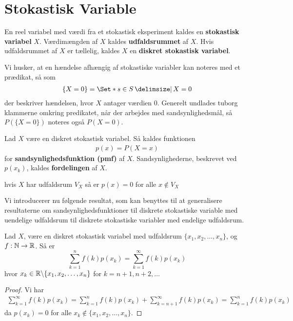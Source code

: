 \section{Stokastisk Variable} \label{sec:SV}
\begin{defn}%
En reel variabel med værdi fra et stokastisk eksperiment kaldes en \textbf{stokastisk variabel} $X$. Værdimængden af $X$ kaldes \textbf{udfaldsrummet} af $X$. Hvis udfaldsrummet af $X$ er tællelig, kaldes $X$ en \textbf{diskret stokastisk variabel}.
\end{defn}

Vi husker, at en hændelse afhængig af stokastiske variabler kan noteres med et prædikat, så som
\begin{align*}
    \{X=0\}=\Set*{s\in S\given X=0}
\end{align*}
der beskriver hændelsen, hvor $X$ antager værdien $0$.
Generelt undlades tuborg klammerne omkring predikatet, når der arbejdes med sandsynlighedsmål, så $P(\{X = 0\})$ noteres også $P(X = 0)$.

\begin{defn} [Sandsynlighedsfunktion]%
    Lad $X$ være en diskret stokastisk variabel. Så kaldes funktionen
\begin{align*}
    p(x) = P(X=x) 
\end{align*}
for \textbf{sandsynlighedsfunktion (pmf)} af $X$. Sandsynlighederne, beskrevet ved $p(x_k)$, kaldes \textbf{fordelingen} af $X$.
\end{defn}
\begin{remark}
    hvis $X$ har udfaldsrum $V_X$ så er $p(x) = 0$ for alle $x \not \in V_X$
\end{remark}

Vi introducerer nu følgende resultat, som kan benyttes til at generalisere resultaterne om sandsynlighedsfunktioner til diskrete stokastiske variable med uendelige udfaldsrum til diskrete stokastiske variabler med endelige udfaldsrum.
\begin{lem}
Lad $X$, være en diskret stokastisk variabel med udfaldsrum $\{x_1, x_2, \ldots, x_n\}$, og $f: \mathbb{N} \to \mathbb{R}$. Så er 
\begin{equation*}
    \sum^n_{k = 1} f(k) p(x_k) = \sum^\infty_{k = 1} f(k) p(x_k)
\end{equation*}
hvor $x_k \in \mathbb{R} \backslash \{x_1, x_2, \ldots, x_n\}$ for $k = n + 1, n + 2, \ldots$
\end{lem}
\begin{proof}
Vi har 
\begin{align*}
    \sum^\infty_{k = 1} f(k) p(x_k) =\sum^n_{k = 1} f(k) p(x_k) + \sum^\infty_{k = n + 1} f(k) p(x_k) = \sum^n_{k = 1} f(k) p(x_k) 
\end{align*}
da $p(x_k) = 0$ for alle $x_k \not \in \{x_1, x_2, \ldots, x_n\}$.
\end{proof}



